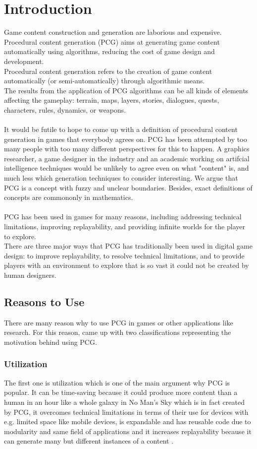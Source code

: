 \documentclass[MGS,Master,english]{twbook}%
\begin{document}
\section{Introduction}
\cite{pcg::PCGinGameIndustry} Game content construction and generation are laborious and expensive. Procedural content generation (PCG) aims at generating game content automatically using algorithms, reducing the cost of game design and development.\\
Procedural content generation refers to the creation of game content automatically (or semi-automatically) through algorithmic means.\\
The results from the application of PCG algorithms can be all kinds of elements affecting the gameplay: terrain, maps, layers, stories, dialogues, quests, characters, rules, dynamics, or weapons.\\
\\
It would be futile to hope to come up with a definition of procedural content generation in games that everybody agrees on. PCG has been attempted by too many people with too many different perspectives for this to happen. A graphics researcher, a game designer in the industry and an academic working on artifcial intelligence techniques would be unlikely to agree even on what "content" is, and much less which generation techniques to consider interesting. We argue that PCG is a concept with fuzzy and unclear boundaries. Besides, exact definitions of concepts are commononly in mathematics. \cite{pcg::whatIsPCG}\\
\\
PCG has been used in games for many reasons, including addressing technical limitations, improving replayability, and providing infinite worlds for the player to explore. \cite{pcg::endlessWeb}\\
There are three major ways that PCG has traditionally been used in digital game design: to improve replayability, to resolve technical limitations, and to provide players with an environment to explore that is so vast it could not be created by human designers.\cite{pcg::endlessWeb}

\subsection{Reasons to Use}
There are many reason why to use PCG in games or other applications like research. For this reason, \cite{pcg::inGameDesign} came up with two classifications representing the motivation behind using PCG.
\subsubsection{Utilization}
The first one is utilization which is one of the main argument why PCG is popular. It can be time-saving because it could produce more content than a human in an hour like a whole galaxy in No Man's Sky \cite{noMansSky} which is in fact created by PCG, it overcomes technical limitations in terms of their use for devices with e.g. limited space like mobile devices, is expandable and has reusable code due to modularity and same field of applications and it increases replayability because it can generate many but different instances of a content \cite{pcg::inGameDesign}.
\end{document}
